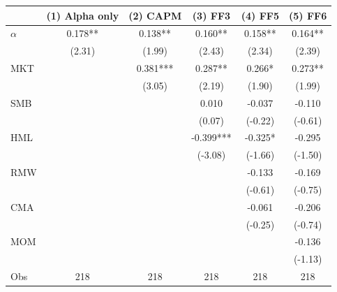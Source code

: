 \begin{tabular}{l*{5}{c}}
\toprule
 & (1) Alpha only & (2) CAPM & (3) FF3 & (4) FF5 & (5) FF6 \\
\midrule
$\alpha$ & 0.178** & 0.138** & 0.160** & 0.158** & 0.164** \\
 & (2.31) & (1.99) & (2.43) & (2.34) & (2.39) \\
MKT &  & 0.381*** & 0.287** & 0.266* & 0.273** \\
 &  & (3.05) & (2.19) & (1.90) & (1.99) \\
SMB &  &  & 0.010 & -0.037 & -0.110 \\
 &  &  & (0.07) & (-0.22) & (-0.61) \\
HML &  &  & -0.399*** & -0.325* & -0.295 \\
 &  &  & (-3.08) & (-1.66) & (-1.50) \\
RMW &  &  &  & -0.133 & -0.169 \\
 &  &  &  & (-0.61) & (-0.75) \\
CMA &  &  &  & -0.061 & -0.206 \\
 &  &  &  & (-0.25) & (-0.74) \\
MOM &  &  &  &  & -0.136 \\
 &  &  &  &  & (-1.13) \\
Obs & 218 & 218 & 218 & 218 & 218 \\
\bottomrule
\end{tabular}